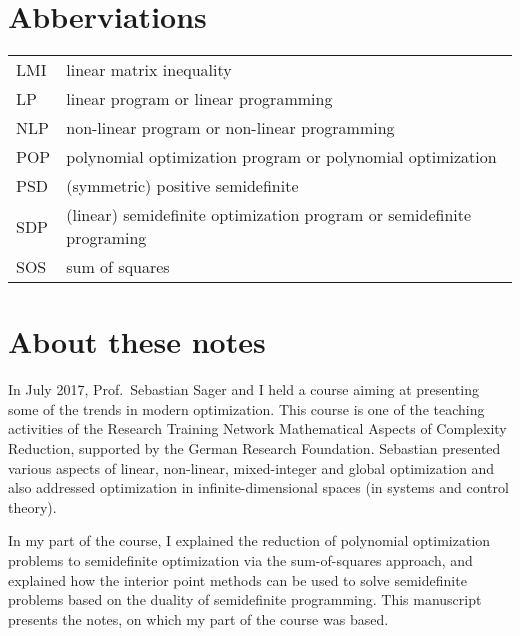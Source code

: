 \clearpage 

\section*{Abberviations}

\begin{tabular}{ll}
	LMI & linear matrix inequality 
	\\ LP & linear program or linear programming 
	\\ NLP & non-linear program or non-linear programming 
	\\ POP & polynomial optimization program or polynomial optimization
	\\ PSD & (symmetric) positive semidefinite
	\\ SDP & (linear) semidefinite optimization program or semidefinite programing
	\\ SOS & sum of squares
\end{tabular}

\clearpage 

\section*{About these notes} 

In July 2017, Prof.~Sebastian Sager and I held a course aiming at presenting some of the trends in modern optimization. This course is one of the teaching activities of the Research Training Network Mathematical Aspects of Complexity Reduction, supported by the German Research Foundation. Sebastian presented various aspects of linear, non-linear, mixed-integer and global optimization and also addressed optimization in infinite-dimensional spaces (in systems and control theory). 

In my part of the course, I explained the reduction of polynomial optimization problems to semidefinite optimization via the sum-of-squares approach, and explained how the interior point methods can be used to solve semidefinite problems based on the duality of semidefinite programming. This manuscript presents the notes, on which my part of the course was based.

